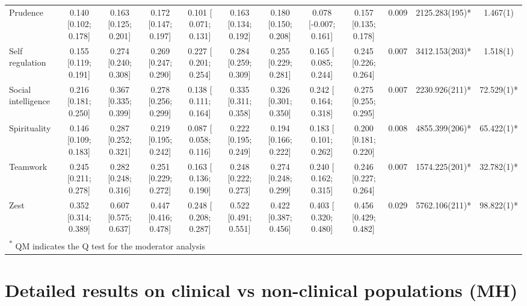 \documentclass[
  man,floatsintext]{apa6}
\begin{document}
\begin{table}
{\begin{tabular}[t]{lccccccccccc}
Prudence & 0.140 [0.102; 0.178] & 0.163 [0.125; 0.201] & 0.172 [0.147; 0.197] & 0.101 [ 0.071; 0.131] & 0.163 [0.134; 0.192] & 0.180 [0.150; 0.208] & 0.078 [-0.007; 0.161] & 0.157 [0.135; 0.178] & 0.009 & 2125.283(195)* & 1.467(1)\\
Self regulation & 0.155 [0.119; 0.191] & 0.274 [0.240; 0.308] & 0.269 [0.247; 0.290] & 0.227 [ 0.201; 0.254] & 0.284 [0.259; 0.309] & 0.255 [0.229; 0.281] & 0.165 [ 0.085; 0.244] & 0.245 [0.226; 0.264] & 0.007 & 3412.153(203)* & 1.518(1)\\
\addlinespace
Social intelligence & 0.216 [0.181; 0.250] & 0.367 [0.335; 0.399] & 0.278 [0.256; 0.299] & 0.138 [ 0.111; 0.164] & 0.335 [0.311; 0.358] & 0.326 [0.301; 0.350] & 0.242 [ 0.164; 0.318] & 0.275 [0.255; 0.295] & 0.007 & 2230.926(211)* & 72.529(1)*\\
Spirituality & 0.146 [0.109; 0.183] & 0.287 [0.252; 0.321] & 0.219 [0.195; 0.242] & 0.087 [ 0.058; 0.116] & 0.222 [0.195; 0.249] & 0.194 [0.166; 0.222] & 0.183 [ 0.101; 0.262] & 0.200 [0.181; 0.220] & 0.008 & 4855.399(206)* & 65.422(1)*\\
Teamwork & 0.245 [0.211; 0.278] & 0.282 [0.248; 0.316] & 0.251 [0.229; 0.272] & 0.163 [ 0.136; 0.190] & 0.248 [0.222; 0.273] & 0.274 [0.248; 0.299] & 0.240 [ 0.162; 0.315] & 0.246 [0.227; 0.264] & 0.007 & 1574.225(201)* & 32.782(1)*\\
Zest & 0.352 [0.314; 0.389] & 0.607 [0.575; 0.637] & 0.447 [0.416; 0.478] & 0.248 [ 0.208; 0.287] & 0.522 [0.491; 0.551] & 0.422 [0.387; 0.456] & 0.403 [ 0.320; 0.480] & 0.456 [0.429; 0.482] & 0.029 & 5762.106(211)* & 98.822(1)*\\
\bottomrule
\multicolumn{12}{l}{\textsuperscript{*} QM indicates the Q test for the moderator analysis}\\
\end{tabular}}
\end{table}

\newpage

\hypertarget{detailed-results-on-clinical-vs-non-clinical-populations-mh}{%
\section{Detailed results on clinical vs non-clinical populations (MH)}\label{detailed-results-on-clinical-vs-non-clinical-populations-mh}}
\end{document}
